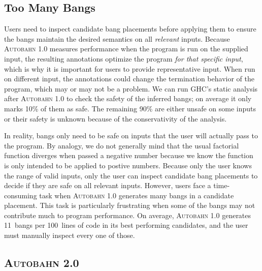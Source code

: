 \documentclass[format=sigplan, review=true, 9pt]{acmart}
\newcommand{\Ao}[0]{\textsc{Autobahn 1.0}}
\newcommand{\At}[0]{\textsc{Autobahn 2.0}}
\begin{document}
\subsection{Too Many Bangs}

Users need to inspect candidate bang placements before applying them
to ensure the bangs maintain the desired semantics on all \textit{relevant}
inputs.  Because \Ao{} measures performance when the program is run on
the supplied input, the resulting annotations optimize the program
\textit{for that specific input}, which is why it is important for users
to provide representative input.  When run on different input, the
annotations could change the termination behavior of the program,
which may or may not be a problem.
We can run GHC's static analysis after
\Ao{} to check the safety of the inferred bangs; on average it
only marks 10\% of them as safe.  The remaining 90\% are either unsafe
on some inputs or their safety is unknown because of the
conservativity of the analysis.


In reality, bangs only need to be safe on inputs that the user will
actually pass to the program.  By analogy, we do not generally mind
that the usual factorial function diverges when passed a negative
number because we know the function is only intended to be applied to
postive numbers.  Because only the user knows the range of valid
inputs, only the user can inspect candidate bang placements to decide
if they are safe on all relevant inputs. However, users face a
time-consuming task when \Ao{} generates many bangs in a candidate
placement.  This task is particularly frustrating when some of the
bangs may not contribute much to program performance. On average,
\Ao{} generates 11~bangs per 100~lines of code in its best performing
candidates, and the user must manually inspect every one of those.

\subsection{\At{}}
\end{document}
